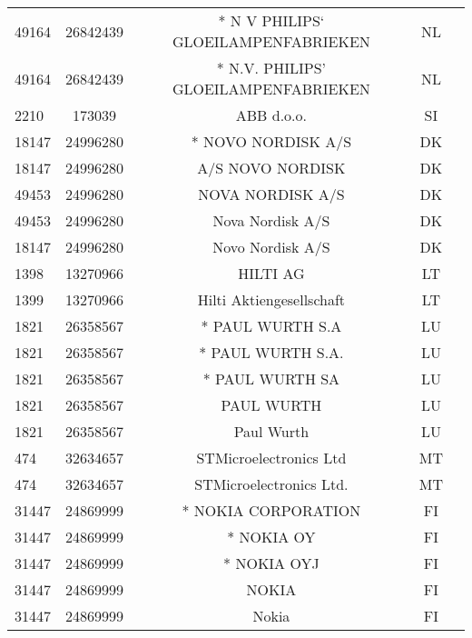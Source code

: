 \begin{longtable}{|l|c|c|c|c|}
     49164 &   26842439 &                * N V PHILIPS` GLOEILAMPENFABRIEKEN &      NL \\
     49164 &   26842439 &               * N.V. PHILIPS' GLOEILAMPENFABRIEKEN &      NL \\
      2210 &     173039 &                                         ABB d.o.o. &      SI \\
     18147 &   24996280 &                                 * NOVO NORDISK A/S &      DK \\
     18147 &   24996280 &                                   A/S NOVO NORDISK &      DK \\
     49453 &   24996280 &                                   NOVA NORDISK A/S &      DK \\
     49453 &   24996280 &                                   Nova Nordisk A/S &      DK \\
     18147 &   24996280 &                                 Novo  Nordisk  A/S &      DK \\
      1398 &   13270966 &                                           HILTI AG &      LT \\
      1399 &   13270966 &                           Hilti Aktiengesellschaft &      LT \\
      1821 &   26358567 &                                   * PAUL WURTH S.A &      LU \\
      1821 &   26358567 &                                  * PAUL WURTH S.A. &      LU \\
      1821 &   26358567 &                                    * PAUL WURTH SA &      LU \\
      1821 &   26358567 &                                         PAUL WURTH &      LU \\
      1821 &   26358567 &                                         Paul Wurth &      LU \\
       474 &   32634657 &                             STMicroelectronics Ltd &      MT \\
       474 &   32634657 &                            STMicroelectronics Ltd. &      MT \\
     31447 &   24869999 &                                * NOKIA CORPORATION &      FI \\
     31447 &   24869999 &                                         * NOKIA OY &      FI \\
     31447 &   24869999 &                                        * NOKIA OYJ &      FI \\
     31447 &   24869999 &                                              NOKIA &      FI \\
     31447 &   24869999 &                                              Nokia &      FI \\
\hline
\end{longtable}

